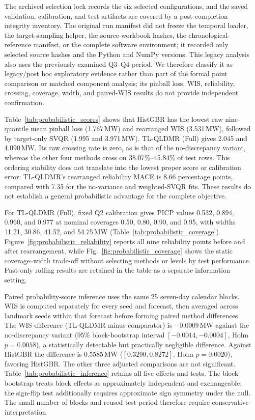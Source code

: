 {\color{blue}The archived selection lock records the six selected configurations, and the saved validation, calibration, and test artifacts are covered by a post-completion integrity inventory. The original run manifest did not freeze the temporal loader, the target-sampling helper, the source-workbook hashes, the chronological-reference manifest, or the complete software environment; it recorded only selected source hashes and the Python and NumPy versions. This legacy analysis also uses the previously examined Q3--Q4 period. We therefore classify it as legacy/post hoc exploratory evidence rather than part of the formal point comparison or matched component analysis; its pinball loss, WIS, reliability, crossing, coverage, width, and paired-WIS results do not provide independent confirmation.}

{\color{blue}Table~\ref{tab:probabilistic_scores} shows that HistGBR has the lowest raw nine-quantile mean pinball loss (1.767\,MW) and rearranged WIS (3.531\,MW), followed by target-only SVQR (1.995 and 3.971\,MW). TL-QLDMR (Full) gives 2.045 and 4.090\,MW. Its raw crossing rate is zero, as is that of the no-discrepancy variant, whereas the other four methods cross on 38.07\%--45.84\% of test rows. This ordering stability does not translate into the lowest proper score or calibration error: TL-QLDMR's rearranged reliability MACE is 8.66 percentage points, compared with 7.35 for the no-variance and weighted-SVQR fits. These results do not establish a general probabilistic advantage for the complete objective.}

{\color{blue}For TL-QLDMR (Full), fixed Q2 calibration gives PICP values 0.532, 0.894, 0.960, and 0.977 at nominal coverages 0.50, 0.80, 0.90, and 0.95, with widths 11.21, 30.86, 41.52, and 54.75\,MW (Table~\ref{tab:probabilistic_coverage}). Figure~\ref{fig:probabilistic_reliability} reports all nine reliability points before and after rearrangement, while Fig.~\ref{fig:probabilistic_coverage} shows the static coverage--width trade-off without selecting methods or levels by test performance. Past-only rolling results are retained in the table as a separate information setting.}

{\color{blue}Paired probability-score inference uses the same 25 seven-day calendar blocks. WIS is computed separately for every seed and forecast, then averaged across landmark seeds within that forecast before forming paired method differences. The WIS difference (TL-QLDMR minus comparator) is $-0.0009$\,MW against the no-discrepancy variant (95\% block-bootstrap interval $[-0.0014,-0.0004]$, Holm $p=0.0058$), a statistically detectable but practically negligible difference. Against HistGBR the difference is $0.5585$\,MW ($[0.3290,0.8272]$, Holm $p=0.0020$), favoring HistGBR. The other three adjusted comparisons are not significant. Table~\ref{tab:probabilistic_inference} retains all five effects and tests. The block bootstrap treats block effects as approximately independent and exchangeable; the sign-flip test additionally requires approximate sign symmetry under the null. The small number of blocks and reused test period therefore require conservative interpretation.}


